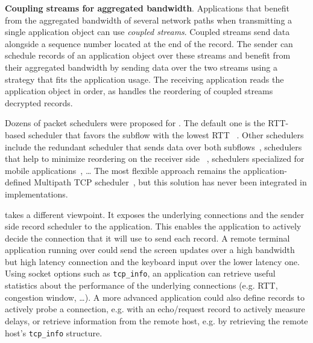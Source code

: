 

\textbf{Coupling streams for aggregated bandwidth}. 
Applications that benefit
from the aggregated bandwidth of several network paths when transmitting a
single application object can use \tcpls \textit{coupled streams}. Coupled
streams send data alongside a sequence number located at the end of
the record. The sender can schedule \tcpls records of an application
object over these streams and benefit from their aggregated bandwidth by 
sending data over the two streams using a strategy that fits the application 
usage. The receiving application reads the application object in order, as 
\tcpls handles the reordering of coupled streams decrypted records.

Dozens of packet schedulers were proposed for \mptcp. The default one is the
RTT-based scheduler that favors the subflow with the lowest RTT
~\cite{paasch2014experimental}. Other schedulers include the redundant
scheduler
that sends data over both subflows~\cite{frommgen2016remp}, schedulers that
help to minimize reordering on the receiver side~
\cite{lim2017ecf,hurtig2018low}, schedulers specialized for mobile
applications~\cite{de2018tuning}, \ldots
The most flexible approach remains the application-defined Multipath TCP
scheduler~\cite{frommgen2017programming}, but this solution has never been
integrated in \mptcp implementations.

\tcpls takes a different viewpoint. It exposes the underlying \tcp connections
and the sender side \tcpls record scheduler to the application. This enables
the application to actively decide the \tcp connection that it will use to send
each record. A remote terminal application running over \tcpls could send the
screen updates over a high bandwidth but high latency connection and the
keyboard input over the lower latency one.
Using socket options such as
\texttt{tcp\_info}, an application can retrieve useful statistics about the
performance of the underlying \tcp connections (e.g. RTT, congestion window,
\ldots). %
A more advanced application could also define \tcpls records to actively
probe a connection, e.g. with an echo/request record to actively measure
delays, or retrieve information from the remote host, e.g. by retrieving the
remote host's \texttt{tcp\_info} structure.


